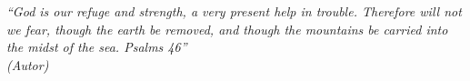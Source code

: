 \begin{epigrafe}
    \vspace*{\fill}
	\begin{flushright}
		\textit{``God is our refuge and strength, a very present help in trouble.
		Therefore will not we fear, though the earth be removed, and though the mountains be carried into the midst of the sea. Psalms 46''\\
		(Autor)}
	\end{flushright}
\end{epigrafe}
